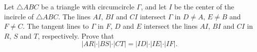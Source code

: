 Let $\triangle ABC$ be a triangle with circumcircle $\Gamma$,  and let $I$ be the center of the incircle of $\triangle ABC$. The lines $AI$,  $BI$ and $CI$ intersect $\Gamma$ in $D \ne A$,  $E \ne B$ and $F \ne C$. The tangent lines to $\Gamma$ in $F$,  $D$ and $E$ intersect the lines $AI$,  $BI$ and $CI$ in $R$,  $S$ and $T$,  respectively. Prove that\[\vert AR\vert \cdot \vert BS\vert \cdot \vert CT\vert = \vert ID\vert \cdot \vert IE\vert \cdot \vert IF\vert.\]